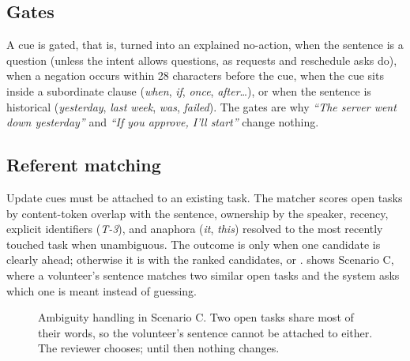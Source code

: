 \subsection{Gates}
A cue is gated, that is, turned into an explained no-action, when the sentence is a question (unless the intent allows questions, as requests and reschedule asks do), when a negation occurs within 28 characters before the cue, when the cue sits inside a subordinate clause (\emph{when}, \emph{if}, \emph{once}, \emph{after}\ldots), or when the sentence is historical (\emph{yesterday}, \emph{last week}, \emph{was}, \emph{failed}). The gates are why \emph{``The server went down yesterday''} and \emph{``If you approve, I'll start''} change nothing.

\subsection{Referent matching}
Update cues must be attached to an existing task. The matcher scores open tasks by content-token overlap with the sentence, ownership by the speaker, recency, explicit identifiers (\emph{T-3}), and anaphora (\emph{it}, \emph{this}) resolved to the most recently touched task when unambiguous. The outcome is  only when one candidate is clearly ahead; otherwise it is  with the ranked candidates, or .  shows Scenario C, where a volunteer's sentence matches two similar open tasks and the system asks which one is meant instead of guessing.

\begin{figure}[t]
\centering
{}
\caption[Ambiguity handling]{Ambiguity handling in Scenario C. Two open tasks share most of their words, so the volunteer's sentence cannot be attached to either. The reviewer chooses; until then nothing changes.}
\label{fig:ambiguity}
\end{figure}

